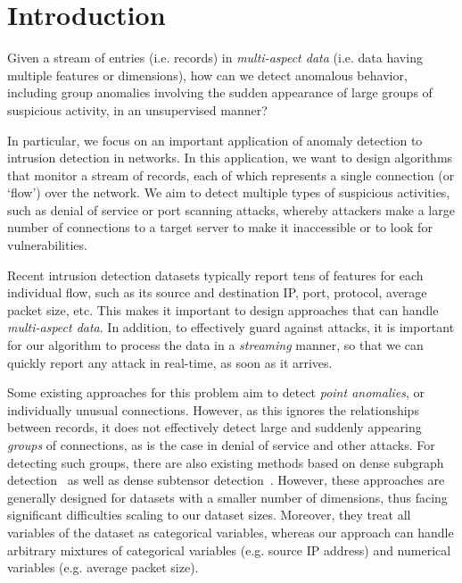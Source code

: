 \documentclass[sigconf]{acmart}
\begin{document}




\maketitle



\section{Introduction}

Given a stream of entries (i.e. records) in \emph{multi-aspect data} (i.e. data having multiple features or dimensions), how can we detect anomalous behavior, including group anomalies involving the sudden appearance of large groups of suspicious activity, in an unsupervised manner?

In particular, we focus on an important application of anomaly detection to intrusion detection in networks. In this application, we want to design algorithms that monitor a stream of records, each of which represents a single connection (or `flow') over the network.
We aim to detect multiple types of suspicious activities, such as denial of service or port scanning attacks, whereby attackers make a large number of connections to a target server to make it inaccessible or to look for vulnerabilities. 

Recent intrusion detection datasets typically report tens of features for each individual flow, such as its source and destination IP, port, protocol, average packet size, etc. This makes it important to design approaches that can handle \emph{multi-aspect data}. In addition, to effectively guard against attacks, it is important for our algorithm to process the data in a \emph{streaming} manner, so that we can quickly report any attack in real-time, as soon as it arrives.

Some existing approaches for this problem aim to detect \emph{point anomalies}, or individually unusual connections. However, as this ignores the relationships between records, it does not effectively detect large and suddenly appearing \emph{groups} of connections, as is the case in denial of service and other attacks. For detecting such groups, there are also existing methods based on dense subgraph detection~\cite{bhatia2020midas} as well as dense subtensor detection~\cite{shin2017densealert,sun2006beyond}. However, these approaches are generally designed for datasets with a smaller number of dimensions, thus facing significant difficulties scaling to our dataset sizes. Moreover, they treat all variables of the dataset as categorical variables, whereas our approach can handle arbitrary mixtures of categorical variables (e.g. source IP address) and numerical variables (e.g. average packet size). 
\end{document}
